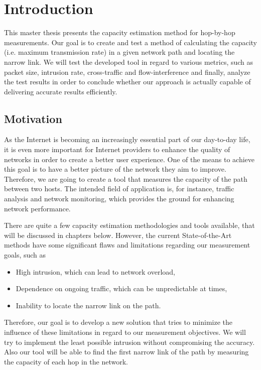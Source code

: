 \chapter{Introduction}
This master thesis presents the capacity estimation method for hop-by-hop measurements. Our goal is to create and test a method of calculating the capacity (i.e. maximum transmission rate) in a given network path and locating the narrow link.
We will test the developed tool in regard to various metrics, such as packet size, intrusion rate, cross-traffic and flow-interference and finally, analyze the test results in order to conclude whether our approach is actually capable of delivering accurate results efficiently. 

\section{Motivation}
As the Internet is becoming an increasingly essential part of our day-to-day life, it is even more important for Internet providers to enhance the quality of networks in order to create a better user experience. One of the means to achieve this goal is to have a better picture of the network they aim to improve. Therefore, we are going to create a tool that measures the capacity of the path between two hosts. The intended field of application is, for instance,  traffic analysis and network monitoring, which provides the ground for enhancing network performance. 

There are quite a few capacity estimation methodologies and tools available, that will be discussed in chapters below. However, the current State-of-the-Art methods have some significant flaws and limitations regarding our measurement goals, such as  
\begin{itemize}
	\item High intrusion, which can lead to network overload,
	\item Dependence on ongoing traffic, which can be unpredictable at times,
	\item Inability to locate the narrow link on the path.
\end{itemize}

Therefore, our goal is to develop a new solution that tries to minimize the influence of these limitations in regard to our measurement objectives. We will try to implement the least possible intrusion without compromising the accuracy. Also our tool will be able to find the first narrow link of the path by measuring the capacity of each hop in the network. 


